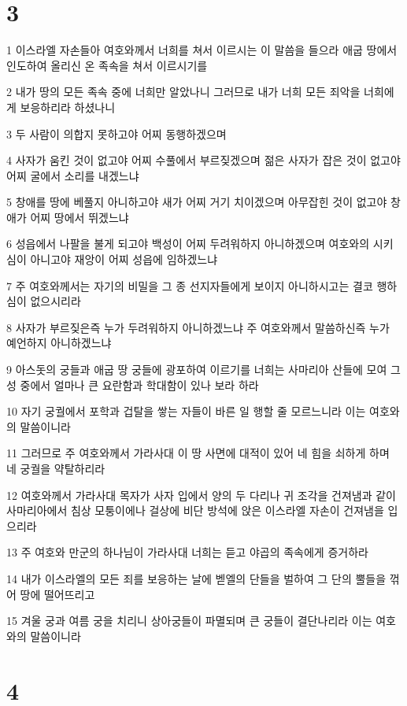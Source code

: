 \chapter{3}

\par 1 이스라엘 자손들아 여호와께서 너희를 쳐서 이르시는 이 말씀을 들으라 애굽 땅에서 인도하여 올리신 온 족속을 쳐서 이르시기를
\par 2 내가 땅의 모든 족속 중에 너희만 알았나니 그러므로 내가 너희 모든 죄악을 너희에게 보응하리라 하셨나니
\par 3 두 사람이 의합지 못하고야 어찌 동행하겠으며
\par 4 사자가 움킨 것이 없고야 어찌 수풀에서 부르짖겠으며 젊은 사자가 잡은 것이 없고야 어찌 굴에서 소리를 내겠느냐
\par 5 창애를 땅에 베풀지 아니하고야 새가 어찌 거기 치이겠으며 아무잡힌 것이 없고야 창애가 어찌 땅에서 뛰겠느냐
\par 6 성읍에서 나팔을 불게 되고야 백성이 어찌 두려워하지 아니하겠으며 여호와의 시키심이 아니고야 재앙이 어찌 성읍에 임하겠느냐
\par 7 주 여호와께서는 자기의 비밀을 그 종 선지자들에게 보이지 아니하시고는 결코 행하심이 없으시리라
\par 8 사자가 부르짖은즉 누가 두려워하지 아니하겠느냐 주 여호와께서 말씀하신즉 누가 예언하지 아니하겠느냐
\par 9 아스돗의 궁들과 애굽 땅 궁들에 광포하여 이르기를 너희는 사마리아 산들에 모여 그 성 중에서 얼마나 큰 요란함과 학대함이 있나 보라 하라
\par 10 자기 궁궐에서 포학과 겁탈을 쌓는 자들이 바른 일 행할 줄 모르느니라 이는 여호와의 말씀이니라
\par 11 그러므로 주 여호와께서 가라사대 이 땅 사면에 대적이 있어 네 힘을 쇠하게 하며 네 궁궐을 약탈하리라
\par 12 여호와께서 가라사대 목자가 사자 입에서 양의 두 다리나 귀 조각을 건져냄과 같이 사마리아에서 침상 모퉁이에나 걸상에 비단 방석에 앉은 이스라엘 자손이 건져냄을 입으리라
\par 13 주 여호와 만군의 하나님이 가라사대 너희는 듣고 야곱의 족속에게 증거하라
\par 14 내가 이스라엘의 모든 죄를 보응하는 날에 벧엘의 단들을 벌하여 그 단의 뿔들을 꺾어 땅에 떨어뜨리고
\par 15 겨울 궁과 여름 궁을 치리니 상아궁들이 파멸되며 큰 궁들이 결단나리라 이는 여호와의 말씀이니라

\chapter{4}

